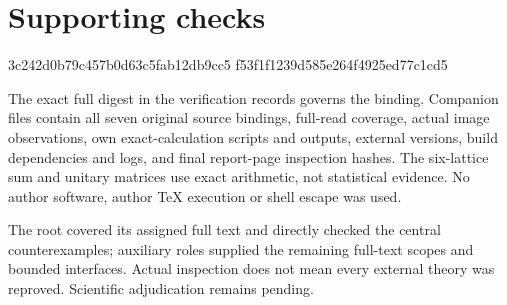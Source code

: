 \documentclass[10pt]{article}
\begin{document}
\section*{Supporting checks}
3c242d0b79c457b0d63c5fab12db9cc5
f53f1f1239d585e264f4925ed77c1cd5\par
The exact full digest in the verification records governs the binding. Companion files contain all seven original source bindings, full-read coverage, actual image observations, own exact-calculation scripts and outputs, external versions, build dependencies and logs, and final report-page inspection hashes. The six-lattice sum and unitary matrices use exact arithmetic, not statistical evidence. No author software, author TeX execution or shell escape was used.\par
The root covered its assigned full text and directly checked the central counterexamples; auxiliary roles supplied the remaining full-text scopes and bounded interfaces. Actual inspection does not mean every external theory was reproved. Scientific adjudication remains pending.\par
\end{document}
